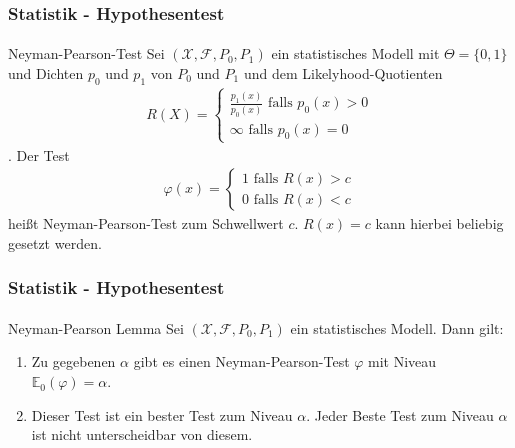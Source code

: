 \documentclass{beamer}
\begin{document}
\begin{frame}
    \frametitle{Statistik - Hypothesentest}
\framesubtitle{}
\begin{block}{Neyman-Pearson-Test}
Sei   $(\mathcal{X}, \mathcal{F}, P_0, P_1)$ ein statistisches Modell mit $\Theta = \{ 0,1\}$ und Dichten $p_0$ und $p_1$ von $P_0$ und $P_1$ und dem Likelyhood-Quotienten
 \begin{align*}
 R(X) = \begin{cases} \frac{p_1(x)}{p_0(x)} \text{ falls } p_0(x) > 0 \\ \infty  \text{ falls } p_0(x) = 0 \end{cases}
\end{align*}. 
Der Test 
\begin{align*}
 \varphi(x) = \begin{cases} 1 \text{ falls } R(x) > c \\ 0  \text{ falls } R(x) < c \end{cases}
\end{align*}
heißt Neyman-Pearson-Test zum Schwellwert $c$. $R(x) = c$ kann hierbei beliebig gesetzt werden.
\end{block}

 \end{frame}


\begin{frame}
    \frametitle{Statistik - Hypothesentest}
\framesubtitle{}
\begin{block}{Neyman-Pearson Lemma}
Sei   $(\mathcal{X}, \mathcal{F}, P_0, P_1)$ ein statistisches Modell. Dann gilt:
\begin{enumerate}
\item Zu gegebenen $\alpha$ gibt es einen Neyman-Pearson-Test  $\varphi$ mit Niveau $\mathbb{E}_0(\varphi) = \alpha$.
\item Dieser Test ist ein bester Test zum Niveau $\alpha$. Jeder Beste Test   zum Niveau $\alpha$ ist nicht unterscheidbar von diesem.
\end{enumerate}
\end{block}

 \end{frame}
\end{document}
